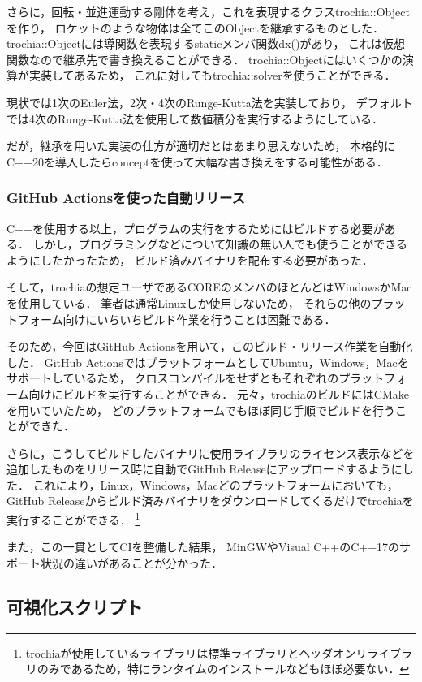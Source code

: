 \documentclass[a4j,10pt]{jsarticle}
\begin{document}
さらに，回転・並進運動する剛体を考え，これを表現するクラスtrochia::Objectを作り，
ロケットのような物体は全てこのObjectを継承するものとした．
trochia::Objectには導関数を表現するstaticメンバ関数dx()があり，
これは仮想関数なので継承先で書き換えることができる．
trochia::Objectにはいくつかの演算が実装してあるため，
これに対してもtrochia::solverを使うことができる．

現状では1次のEuler法，2次・4次のRunge-Kutta法を実装しており，
デフォルトでは4次のRunge-Kutta法を使用して数値積分を実行するようにしている．

だが，継承を用いた実装の仕方が適切だとはあまり思えないため，
本格的にC++20を導入したらconceptを使って大幅な書き換えをする可能性がある．

\subsubsection{GitHub Actionsを使った自動リリース}

C++を使用する以上，プログラムの実行をするためにはビルドする必要がある．
しかし，プログラミングなどについて知識の無い人でも使うことができるようにしたかったため，
ビルド済みバイナリを配布する必要があった．

そして，trochiaの想定ユーザであるCOREのメンバのほとんどはWindowsかMacを使用している．
筆者は通常Linuxしか使用しないため，
それらの他のプラットフォーム向けにいちいちビルド作業を行うことは困難である．

そのため，今回はGitHub Actionsを用いて，このビルド・リリース作業を自動化した．
GitHub ActionsではプラットフォームとしてUbuntu，Windows，Macをサポートしているため，
クロスコンパイルをせずともそれぞれのプラットフォーム向けにビルドを実行することができる．
元々，trochiaのビルドにはCMakeを用いていたため，
どのプラットフォームでもほぼ同じ手順でビルドを行うことができた．

さらに，こうしてビルドしたバイナリに使用ライブラリのライセンス表示などを追加したものをリリース時に自動でGitHub Releaseにアップロードするようにした．
これにより，Linux，Windows，Macどのプラットフォームにおいても，
GitHub Releaseからビルド済みバイナリをダウンロードしてくるだけでtrochiaを実行することができる．
\footnote{trochiaが使用しているライブラリは標準ライブラリとヘッダオンリライブラリのみであるため，特にランタイムのインストールなどもほぼ必要ない．}

また，この一貫としてCIを整備した結果，
MinGWやVisual C++のC++17のサポート状況の違いがあることが分かった．

\subsection{可視化スクリプト}
\end{document}
